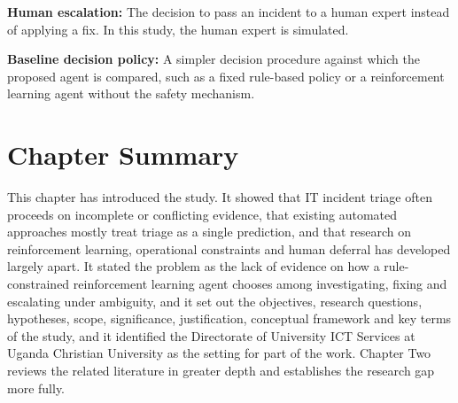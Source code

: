 \textbf{Human escalation:} The decision to pass an incident to a human expert instead of applying a fix. In this study, the human expert is simulated.

\textbf{Baseline decision policy:} A simpler decision procedure against which the proposed agent is compared, such as a fixed rule-based policy or a reinforcement learning agent without the safety mechanism.

\section{Chapter Summary}

This chapter has introduced the study. It showed that IT incident triage often proceeds on incomplete or conflicting evidence, that existing automated approaches mostly treat triage as a single prediction, and that research on reinforcement learning, operational constraints and human deferral has developed largely apart. It stated the problem as the lack of evidence on how a rule-constrained reinforcement learning agent chooses among investigating, fixing and escalating under ambiguity, and it set out the objectives, research questions, hypotheses, scope, significance, justification, conceptual framework and key terms of the study, and it identified the Directorate of University ICT Services at Uganda Christian University as the setting for part of the work. Chapter Two reviews the related literature in greater depth and establishes the research gap more fully.
